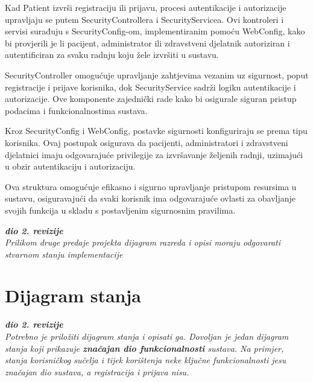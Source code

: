 Kad Patient izvrši registraciju ili prijavu, procesi autentikacije i autorizacije upravljaju se putem SecurityControllera i SecurityServicea. Ovi kontroleri i servisi surađuju s SecurityConfig-om, implementiranim pomoću WebConfig, kako bi provjerili je li pacijent, administrator ili zdravstveni djelatnik autoriziran i autentificiran za svaku radnju koju žele izvršiti u sustavu.

SecurityController omogućuje upravljanje zahtjevima vezanim uz sigurnost, poput registracije i prijave korisnika, dok SecurityService sadrži logiku autentikacije i autorizacije. Ove komponente zajednički rade kako bi osigurale siguran pristup podacima i funkcionalnostima sustava.

Kroz SecurityConfig i WebConfig, postavke sigurnosti konfiguriraju se prema tipu korisnika. Ovaj postupak osigurava da pacijenti, administratori i zdravstveni djelatnici imaju odgovarajuće privilegije za izvršavanje željenih radnji, uzimajući u obzir autentikaciju i autorizaciju.

Ova struktura omogućuje efikasno i sigurno upravljanje pristupom resursima u sustavu, osiguravajući da svaki korisnik ima odgovarajuće ovlasti za obavljanje svojih funkcija u skladu s postavljenim sigurnosnim pravilima.

 

 

 

  

   
   \textbf{\textit{dio 2. revizije}}\\			
			
			\textit{Prilikom druge predaje projekta dijagram razreda i opisi moraju odgovarati stvarnom stanju implementacije}
			
			
			
			\eject
		
		\section{Dijagram stanja}
			
			
			\textbf{\textit{dio 2. revizije}}\\
			
			\textit{Potrebno je priložiti dijagram stanja i opisati ga. Dovoljan je jedan dijagram stanja koji prikazuje \textbf{značajan dio funkcionalnosti} sustava. Na primjer, stanja korisničkog sučelja i tijek korištenja neke ključne funkcionalnosti jesu značajan dio sustava, a registracija i prijava nisu. }
			
